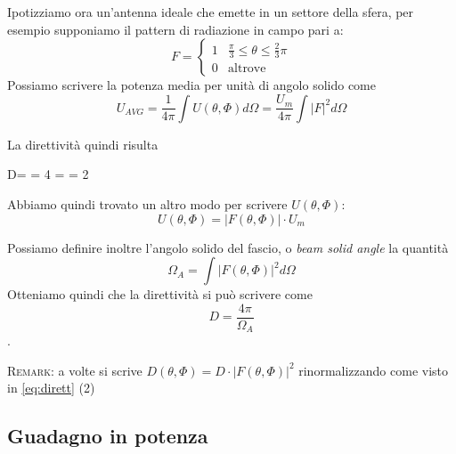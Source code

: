 Ipotizziamo ora un'antenna ideale che emette in un settore della sfera, per esempio supponiamo il pattern di radiazione in campo pari a:
\begin{equation}F=\begin{cases}
  1 & \frac{\pi}{3}\le \theta \le\frac{2}{3}\pi \\ 0 & \text{altrove}
\end{cases}\end{equation}
Possiamo scrivere la potenza media per unità di angolo solido come
\begin{equation}
  U_{AVG} =\frac{1}{4\pi}\int U(\theta,\Phi) d\Omega = \frac{U_m}{4\pi}\int |F|^2 d\Omega
\end{equation}

La direttività quindi risulta
\begin{esp*}
  D= = 4\pi{}\cdot {} = \frac{4\pi}{2\pi} = 2
\end{esp*}
Abbiamo quindi trovato un altro modo per scrivere $U(\theta,\Phi)$:
\begin{equation}
  U(\theta,\Phi) = |F(\theta,\Phi)|\cdot U_m
\end{equation}

Possiamo definire inoltre l'angolo solido del fascio, o \textit{beam solid angle} la quantità
\begin{equation}
  \Omega_A = \int |F(\theta,\Phi)|^2 d\Omega
\end{equation}
Otteniamo quindi che la direttività si può scrivere come
$$D= \frac{4\pi}{\Omega_A}$$.

\textsc{Remark:} a volte si scrive $D(\theta,\Phi) = D \cdot |F(\theta,\Phi)|^2$ rinormalizzando come visto in \eqref{eq:dirett} (2)
\subsection{Guadagno in potenza}
